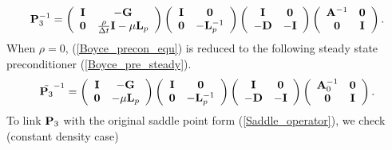 \documentclass[9pt]{article}
\begin{document}
\begin{equation}\label{Boyce_precon_equ}
{\bf P}_3^{-1}=\left(\begin{array}{cc}
{\bf I} & - {\bf G} \\
{\bf 0}      & \frac{\rho}{\Delta t}{\bf I}- \mu {\bf L}_p
\end{array}\right)
\left(\begin{array}{cc}
{\bf I}     &  {\bf 0} \\
{\bf 0}     &  -{\bf L}_p^{-1}
\end{array}\right)
\left(\begin{array}{cc}
{\bf I}     &  {\bf 0} \\
-{\bf D}     &  -{\bf I}
\end{array}\right)
\left(\begin{array}{cc}
{\bf A}^{-1}       & {\bf 0} \\
{\bf 0}            & {\bf I}
\end{array}\right).
\end{equation}
When $\rho=0$, (\ref{Boyce_precon_equ}) is reduced to the following steady state preconditioner (\ref{Boyce_pre_steady}).
\begin{equation}\label{Boyce_pre_steady}
\tilde{{\bf P}_3}^{-1}=\left(\begin{array}{cc}
{\bf I}      & -{\bf G} \\
{\bf 0}      & -\mu {\bf L}_p
\end{array}\right)
\left(\begin{array}{cc}
{\bf I}      & {\bf 0} \\
{\bf 0}      & -{\bf L}_p^{-1}
\end{array}\right)
\left(\begin{array}{cc}
{\bf I}      &  {\bf 0} \\
-{\bf D}     &  -{\bf I}
\end{array}\right)
\left(\begin{array}{cc}
{\bf A}_0^{-1}     & {\bf 0} \\
{\bf 0}            & {\bf I}
\end{array}\right).
\end{equation}
To link ${\bf P}_3$ with the original saddle point form (\ref{Saddle_operator}), we check (constant density case)
\end{document}
